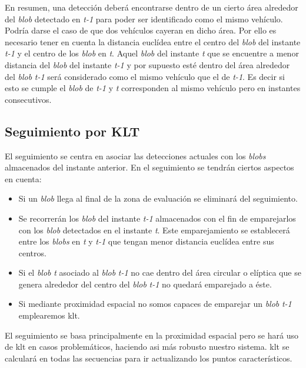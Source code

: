 En resumen, una detección deberá encontrarse dentro de un cierto área alrededor del \textit{blob} detectado en \textit{t-1} para poder ser identificado como el mismo vehículo. Podría darse el caso de que dos vehículos cayeran en dicho área. Por ello es necesario tener en cuenta la distancia euclídea entre el centro del \textit{blob} del instante \textit{t-1} y el centro de los \textit{blob} en \textit{t}. Aquel \textit{blob} del instante \textit{t} que se encuentre a menor distancia del \textit{blob} del instante \textit{t-1} y por supuesto esté dentro del área alrededor del \textit{blob} \textit{t-1} será considerado como el mismo vehículo que el de \textit{t-1}. Es decir si esto se cumple el \textit{blob} de \textit{t-1} y \textit{t} corresponden al  mismo vehículo pero en instantes consecutivos.

\subsection{Seguimiento por KLT}

El seguimiento se centra en asociar las detecciones actuales con los \textit{blobs} almacenados del instante anterior. En el seguimiento se tendrán ciertos aspectos en cuenta:

\begin{itemize}
    \item Si un \textit{blob} llega al final de la zona de evaluación se eliminará del seguimiento.
    \item Se recorrerán los \textit{blob} del instante \textit{t-1} almacenados con el fin de emparejarlos con los \textit{blob} detectados en el instante \textit{t}. Este emparejamiento se establecerá entre los \textit{blobs} en \textit{t} y \textit{t-1} que tengan menor distancia euclídea entre sus centros.
    \item Si el \textit{blob} \textit{t} asociado al \textit{blob} \textit{t-1} no cae dentro del área circular o elíptica que se genera alrededor del centro del  \textit{blob} \textit{t-1} no quedará emparejado a éste. 
    \item Si mediante proximidad espacial no somos capaces de emparejar un \textit{blob} \textit{t-1} emplearemos \acrshort{klt}.
\end{itemize}

El seguimiento se basa principalmente en la proximidad espacial pero se hará uso de \acrshort{klt} en casos problemáticos, haciendo asi más robusto nuestro sistema. \acrshort{klt} se calculará en todas las secuencias para ir actualizando los puntos característicos.


